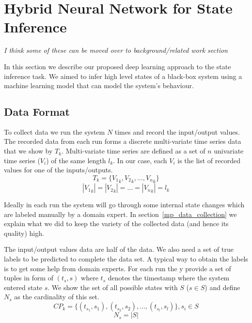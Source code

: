 \section{Hybrid Neural Network for State Inference}
\textit{I think some of these can be moved over to background/related work section}

In this section we describe our proposed deep learning approach to the state inference task. 
We aimed to infer high level states of a black-box system using a machine learning model that can model the system's behaviour. 

\subsection{Data Format} \label{data_collection}

To collect data we run the system $N$ times and record the input/output values. The recorded data from each run forms a discrete multi-variate time series data that we show by $T_k$. 
Multi-variate time series are defined as a set of $n$ univariate time series ($V_i$) of the same length $l_k$. In our case, each $V_i$ is the list of recorded values for one of the inputs/outputs.
\begin{equation}
    T_k = \{{V_1}_k, {V_2}_k, \ldots, {V_n}_k\}
\end{equation}
\begin{equation}
    |{V_1}_k|=|{V_2}_k|=\ldots=|{V_n}_k|=l_k 
\end{equation}


Ideally in each run the system will go through some internal state changes which are labeled manually by a domain expert. In section~\ref{mp_data_collection} we explain what we did to keep the variety of the collected data (and hence its quality) high.

The input/output values data are half of the data. We also need a set of true labels to be predicted to complete the data set.
A typical way to obtain the labels is to get some help from domain experts. For each run the y provide a set of tuples in form of $(t_s, s)$ where $t_s$ denotes the timestamp where the system entered state $s$. We show the set of all possible states with $S$ ($s \in S$) and define $N_s$ as the cardinality of this set. 
\begin{equation}\label{eq:change_point}
    CP_k = \big\{ (t_{s_1}, s_1), (t_{s_2}, s_2), \ldots, (t_{s_l}, s_l) \big\} , s_i \in S
\end{equation}
$$N_s = |S|$$


